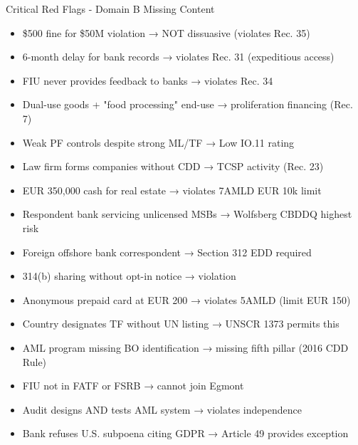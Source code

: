 \documentclass[11pt,a4paper]{beamer}
\begin{document}
\begin{frame}{Critical Red Flags - Domain B Missing Content}
\begin{itemize}
\item \$500 fine for \$50M violation → NOT dissuasive (violates Rec. 35)
\item 6-month delay for bank records → violates Rec. 31 (expeditious access)
\item FIU never provides feedback to banks → violates Rec. 34
\item Dual-use goods + "food processing" end-use → proliferation financing (Rec. 7)
\item Weak PF controls despite strong ML/TF → Low IO.11 rating
\item Law firm forms companies without CDD → TCSP activity (Rec. 23)
\item EUR 350,000 cash for real estate → violates 7AMLD EUR 10k limit
\item Respondent bank servicing unlicensed MSBs → Wolfsberg CBDDQ highest risk
\item Foreign offshore bank correspondent → Section 312 EDD required
\item 314(b) sharing without opt-in notice → violation
\item Anonymous prepaid card at EUR 200 → violates 5AMLD (limit EUR 150)
\item Country designates TF without UN listing → UNSCR 1373 permits this
\item AML program missing BO identification → missing fifth pillar (2016 CDD Rule)
\item FIU not in FATF or FSRB → cannot join Egmont
\item Audit designs AND tests AML system → violates independence
\item Bank refuses U.S. subpoena citing GDPR → Article 49 provides exception
\end{itemize}
\end{frame}
\end{document}
